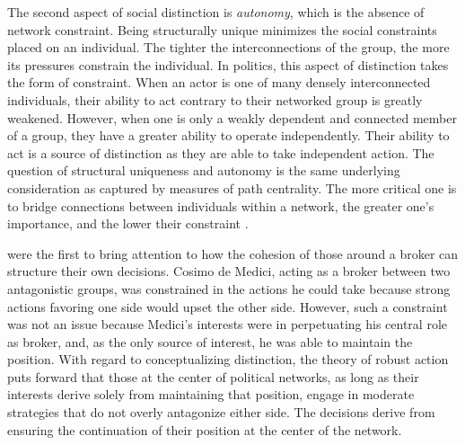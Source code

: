 \documentclass[12pt]{article}
\begin{document}
The second aspect of social distinction is \textit{autonomy}, which is the absence of network constraint. Being structurally unique minimizes the social constraints placed on an individual. The tighter the interconnections of the group, the more its pressures constrain the individual. In politics, this aspect of distinction takes the form of constraint. When an actor is one of many densely interconnected individuals, their ability to act contrary to their networked group is greatly weakened. However, when one is only a weakly dependent and connected member of a group, they have a greater ability to operate independently. Their ability to act is a source of distinction as they are able to take independent action. The question of structural uniqueness and autonomy is the same underlying consideration as captured by measures of path centrality. The more critical one is to bridge connections between individuals within a network, the greater one's importance, and the lower their constraint \citep{burt92}. 

\citet[1263-4]{padgett_ansell94} were the first to bring attention to how the cohesion of those around a broker can structure their own decisions. Cosimo de Medici, acting as a broker between two antagonistic groups, was constrained in the actions he could take because strong actions favoring one side would upset the other side. However, such a constraint was not an issue because Medici’s interests were in perpetuating his central role as broker, and, as the only source of interest, he was able to maintain the position. With regard to conceptualizing distinction, the theory of robust action puts forward that those at the center of political networks, as long as their interests derive solely from maintaining that position, engage in moderate strategies that do not overly antagonize either side. The decisions derive from ensuring the continuation of their position at the center of the network. 
\end{document}
